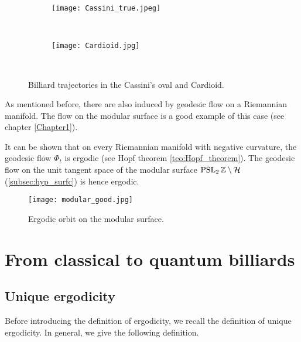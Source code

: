 \begin{figure}[H]
\centering
  \begin{subfigure}[b]{0.5\textwidth}
  \centering
    \texttt{[image: Cassini\_true.jpeg]}
    \label{fig:oval}
  \end{subfigure}
    \noindent\\
  \begin{subfigure}[b]{0.4\textwidth}
  \centering
    \texttt{[image: Cardioid.jpg]}
    \label{fig:cass}
  \end{subfigure}
  \noindent\\
  \decoRule
  \caption{Billiard trajectories in the Cassini's oval and Cardioid.}
  \label{fig:oval_card_orbits}
\end{figure}

As mentioned before, there are also  induced by geodesic flow on a Riemannian manifold. The flow on the modular surface is a good example of this case (see chapter \ref{Chapter1}).

\begin{nese}
It can be shown that on every Riemannian manifold with negative curvature, the geodesic flow $\Phi_{t}$ is ergodic (see Hopf theorem \ref{teo:Hopf_theorem}). The geodesic flow on the unit tangent space of the modular surface $\operatorname{PSL}_{2}\mathbb{Z}\setminus\mathcal{H}$ (\ref{subsec:hyp_surfc}) is hence ergodic.
\end{nese}


\begin{figure}[H]
\centering
\texttt{[image: modular\_good.jpg]}
  \noindent\\
  \decoRule
  \caption{Ergodic orbit on the modular surface.}
  \label{fig:oval_card_orbits}
\end{figure}





\section{From classical to quantum billiards}


\subsection{Unique ergodicity}


Before introducing the  definition of ergodicity, we recall the definition of unique ergodicity. In general, we give the following definition.

